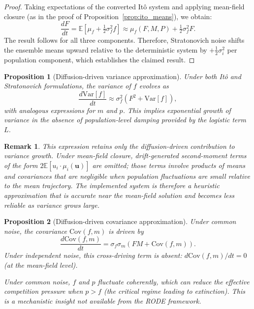 \documentclass[12pt]{article}
\newtheorem{proposition}{Proposition}
\newtheorem{remark}{Remark}
\begin{document}
\begin{proof}
Taking expectations of the converted It\^{o} system and applying mean-field closure (as in the proof of Proposition~\ref{prop:ito_means}), we obtain:
\begin{equation}
  \frac{dF}{dt} = \mathbb{E}[\mu_f + \tfrac{1}{2}\sigma_f^2 f] \approx \mu_f(F,M,P) + \tfrac{1}{2}\sigma_f^2 F.
\end{equation}
The result follows for all three components.  Therefore, Stratonovich noise shifts the ensemble means upward relative to the deterministic system by $+\tfrac{1}{2}\sigma_i^2$ per population component, which establishes the claimed result.
\end{proof}

\begin{proposition}[Diffusion-driven variance approximation]\label{prop:variance}
Under both It\^{o} and Stratonovich formulations, the variance of $f$ evolves as
\begin{equation}
  \frac{d\mathrm{Var}[f]}{dt} \approx \sigma_f^2 (F^2 + \mathrm{Var}[f]),
\end{equation}
with analogous expressions for $m$ and $p$.  This implies exponential growth of variance in the absence of population-level damping provided by the logistic term $L$.
\end{proposition}

\begin{remark}
This expression retains only the diffusion-driven contribution to variance
growth.  Under mean-field closure, drift-generated second-moment terms of
the form $2\mathbb{E}[u_i \cdot \mu_i(\mathbf{u})]$ are omitted; those
terms involve products of means and covariances that are negligible when
population fluctuations are small relative to the mean trajectory.  The
implemented system is therefore a heuristic approximation that is
accurate near the mean-field solution and becomes less reliable as
variance grows large.
\end{remark}

\begin{proposition}[Diffusion-driven covariance approximation]\label{prop:covariance}
Under common noise, the covariance $\mathrm{Cov}(f,m)$ is driven by
\begin{equation}
  \frac{d\mathrm{Cov}(f,m)}{dt} = \sigma_f \sigma_m (FM + \mathrm{Cov}(f,m)).
\end{equation}
Under independent noise, this cross-driving term is absent: $d\mathrm{Cov}(f,m)/dt = 0$ (at the mean-field level).

Under common noise, $f$ and $p$ fluctuate coherently, which can reduce the effective competition pressure when $p > f$ (the critical regime leading to extinction).  This is a mechanistic insight not available from the RODE framework.
\end{proposition}
\end{document}
